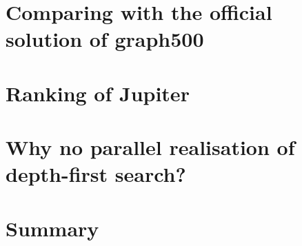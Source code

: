 \documentclass[11pt,a4paper]{article}
\begin{document}
\section{Comparing with the official solution of graph500}
\label{sec:Comparing}

\section{Ranking of Jupiter}
\label{sec:ranking}

\section{Why no parallel realisation of depth-first search?}
\label{sec:depth-first search}

\section{Summary}
\label{sec:summary}

\clearpage



\end{document}
